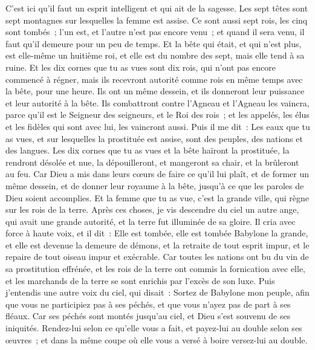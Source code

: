 \begin{multicols}{2}
C'est ici qu'il faut un esprit intelligent et qui ait de la sagesse. Les sept têtes sont sept montagnes sur lesquelles la femme est assise.
Ce sont aussi sept rois, les cinq sont tombés~; l'un est, et l'autre n'est pas encore venu~; et quand il sera venu, il faut qu'il demeure pour un peu de temps.
Et la bête qui était, et qui n'est plus, est elle-même un huitième roi, et elle est du nombre des sept, mais elle tend à sa ruine.
Et les dix cornes que tu as vues sont dix rois, qui n'ont pas encore commencé à régner, mais ils recevront autorité comme rois en même temps avec la bête, pour une heure.
Ils ont un même dessein, et ils donneront leur puissance et leur autorité à la bête.
Ils combattront contre l'Agneau et l'Agneau les vaincra, parce qu'il est le Seigneur des seigneurs, et le Roi des rois~; et les appelés, les élus et les fidèles qui sont avec lui, les vaincront aussi.
Puis il me dit~: Les eaux que tu as vues, et sur lesquelles la prostituée est assise, sont des peuples, des nations et des langues.
Les dix cornes que tu as vues et la bête haïront la prostituée, la rendront désolée et nue, la dépouilleront, et mangeront sa chair, et la brûleront au feu.
Car Dieu a mis dans leurs cœurs de faire ce qu'il lui plaît, et de former un même dessein, et de donner leur royaume à la bête, jusqu'à ce que les paroles de Dieu soient accomplies.
Et la femme que tu as vue, c'est la grande ville, qui règne sur les rois de la terre.
\VerseOne{}Après ces choses, je vis descendre du ciel un autre ange, qui avait une grande autorité, et la terre fut illuminée de sa gloire.
Il cria avec force à haute voix, et il dit~: Elle est tombée, elle est tombée Babylone la grande, et elle est devenue la demeure de démons, et la retraite de tout esprit impur, et le repaire de tout oiseau impur et exécrable.
Car toutes les nations ont bu du vin de sa prostitution effrénée, et les rois de la terre ont commis la fornication avec elle, et les marchands de la terre se sont enrichis par l'excès de son luxe.
Puis j'entendis une autre voix du ciel, qui disait~: Sortez de Babylone mon peuple, afin que vous ne participiez pas à ses péchés, et que vous n'ayez pas de part à ses fléaux.
Car ses péchés sont montés jusqu'au ciel, et Dieu s'est souvenu de ses iniquités.
Rendez-lui selon ce qu'elle vous a fait, et payez-lui au double selon ses œuvres~; et dans la même coupe où elle vous a versé à boire versez-lui au double.

\end{multicols}
